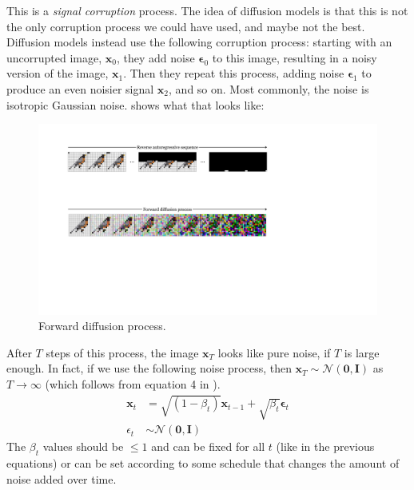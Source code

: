 This is a \textit{signal corruption} process. The idea of diffusion models is that this is not the only corruption process we could have used, and maybe not the best. Diffusion models instead use the following corruption process: starting with an uncorrupted image, $\mathbf{x}_0$, they add noise $\mathbf{\epsilon}_0$ to this image, resulting in a noisy version of the image, $\mathbf{x}_1$. Then they repeat this process, adding noise $\mathbf{\epsilon}_1$ to produce an even noisier signal $\mathbf{x}_2$, and so on. Most commonly, the noise is isotropic Gaussian noise. \Fig{\ref{fig:generative_models:forward_diffusion_process}} shows what that looks like:
\begin{figure}
    \centerline{
        \includegraphics[width=1.0\linewidth]{./figures/generative_models/forward_diffusion_process.pdf}
    }
    \caption{Forward diffusion process.}
    \label{fig:generative_models:forward_diffusion_process}
\end{figure}

After $T$ steps of this process, the image $\mathbf{x}_T$ looks like pure noise, if $T$ is large enough. In fact, if we use the following noise process, then $\mathbf{x}_T \sim \mathcal{N}(\mathbf{0},\mathbf{I})$ as $T \rightarrow \infty$ (which follows from equation 4 in \cite{ho2020denoising}).
\begin{align}
    \mathbf{x}_t &= \sqrt{(1-\beta_t)}\mathbf{x}_{t-1} + \sqrt{\beta_t}\mathbf{\epsilon}_t\\
    \epsilon_t &\sim \mathcal{N}(\mathbf{0},\mathbf{I})
\end{align}
The $\beta_t$ values should be $\leq 1$ and can be fixed for all $t$ (like in the previous equations) or can be set according to some schedule that changes the amount of noise added over time.



